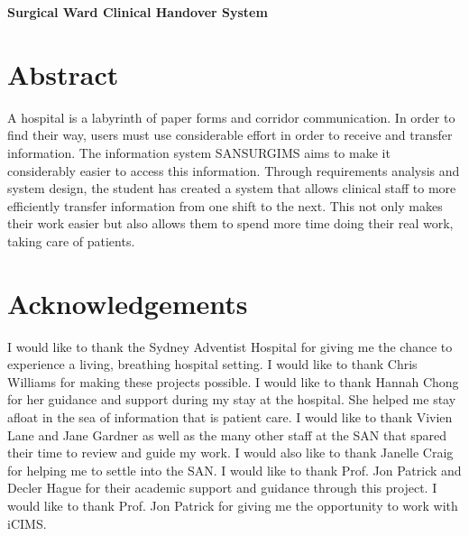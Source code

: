 \begin{center}
\Large\bfseries
Surgical Ward Clinical Handover System
\end{center}

\section*{Abstract}
A hospital is a labyrinth of paper forms and corridor communication. In order to find their way, users must use considerable effort in order to receive and transfer information. The information system SANSURGIMS aims to make it considerably easier to access this information. Through requirements analysis and system design, the student has created a system that allows clinical staff to more efficiently transfer information from one shift to the next. This not only makes their work easier but also allows them to spend more time doing their real work, taking care of patients. 

\section*{Acknowledgements}
I would like to thank the Sydney Adventist Hospital for giving me the chance to experience a living, breathing hospital setting. I would like to thank Chris Williams for making these projects possible. I would like to thank Hannah Chong for her guidance and support during my stay at the hospital. She helped me stay afloat in the sea of information that is patient care. I would like to thank Vivien Lane and Jane Gardner as well as the many other staff at the SAN that spared their time to review and guide my work. I would also like to thank Janelle Craig for helping me to settle into the SAN. I would like to thank Prof. Jon Patrick and Decler Hague for their academic support and guidance through this project. I would like to thank Prof. Jon Patrick for giving me the opportunity to work with iCIMS.

